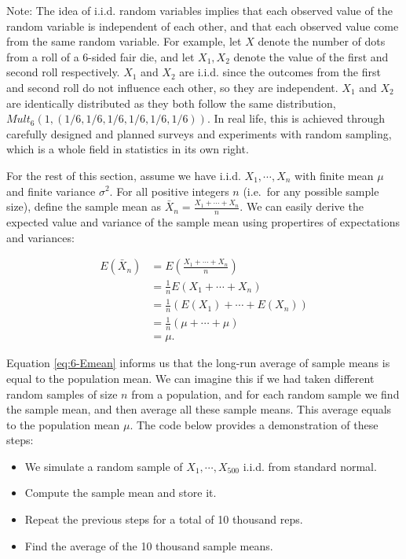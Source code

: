 \documentclass[
]{book}
\providecommand{\tightlist}{%
  \setlength{\itemsep}{0pt}\setlength{\parskip}{0pt}}
\begin{document}
Note: The idea of i.i.d. random variables implies that each observed value of the random variable is independent of each other, and that each observed value come from the same random variable. For example, let \(X\) denote the number of dots from a roll of a 6-sided fair die, and let \(X_1, X_2\) denote the value of the first and second roll respectively. \(X_1\) and \(X_2\) are i.i.d. since the outcomes from the first and second roll do not influence each other, so they are independent. \(X_1\) and \(X_2\) are identically distributed as they both follow the same distribution, \(Mult_6(1, (1/6, 1/6, 1/6, 1/6, 1/6, 1/6))\). In real life, this is achieved through carefully designed and planned surveys and experiments with random sampling, which is a whole field in statistics in its own right.

For the rest of this section, assume we have i.i.d. \(X_1, \cdots, X_n\) with finite mean \(\mu\) and finite variance \(\sigma^2\). For all positive integers \(n\) (i.e.~for any possible sample size), define the sample mean as \(\bar{X}_n = \frac{X_1 + \cdots + X_n}{n}\). We can easily derive the expected value and variance of the sample mean using propertires of expectations and variances:

\begin{equation} 
\begin{split}
E(\bar{X}_n) &= E(\frac{X_1 + \cdots + X_n}{n}) \\
             &= \frac{1}{n}E(X_1 + \cdots + X_n) \\
             &= \frac{1}{n} (E(X_1) + \cdots + E(X_n)) \\
             &= \frac{1}{n} (\mu + \cdots + \mu) \\
             &= \mu.
\end{split}
\label{eq:6-Emean}
\end{equation}

Equation \eqref{eq:6-Emean} informs us that the long-run average of sample means is equal to the population mean. We can imagine this if we had taken different random samples of size \(n\) from a population, and for each random sample we find the sample mean, and then average all these sample means. This average equals to the population mean \(\mu\). The code below provides a demonstration of these steps:

\begin{itemize}
\tightlist
\item
  We simulate a random sample of \(X_1, \cdots, X_{500}\) i.i.d. from standard normal.
\item
  Compute the sample mean and store it.
\item
  Repeat the previous steps for a total of 10 thousand reps.
\item
  Find the average of the 10 thousand sample means.
\end{itemize}
\end{document}
